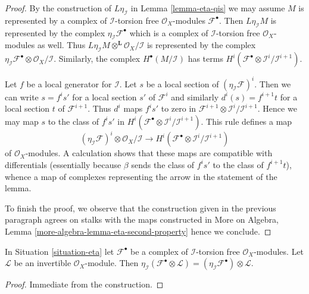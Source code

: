 \begin{proof}
By the construction of $L\eta_\mathcal{I}$ in Lemma \ref{lemma-eta-qis}
we may assume $M$ is represented by a complex of $\mathcal{I}$-torsion
free $\mathcal{O}_X$-modules $\mathcal{F}^\bullet$. Then
$L\eta_\mathcal{I}M$ is represented by the complex
$\eta_\mathcal{I}\mathcal{F}^\bullet$ which is a
complex of $\mathcal{I}$-torsion free $\mathcal{O}_X$-modules as well.
Thus $L\eta_\mathcal{I}M \otimes^\mathbf{L} \mathcal{O}_X/\mathcal{I}$
is represented by the complex
$\eta_\mathcal{I}\mathcal{F}^\bullet \otimes \mathcal{O}_X/\mathcal{I}$.
Similarly, the complex $H^\bullet(M/\mathcal{I})$ has terms
$H^i(\mathcal{F}^\bullet \otimes \mathcal{I}^i/\mathcal{I}^{i + 1})$.

\medskip\noindent
Let $f$ be a local generator for $\mathcal{I}$.
Let $s$ be a local section of $(\eta_\mathcal{I}\mathcal{F})^i$.
Then we can write $s = f^is'$ for a local section $s'$ of
$\mathcal{F}^i$ and similarly $d^i(s) = f^{i + 1}t$ for a local
section $t$ of $\mathcal{F}^{i + 1}$. Thus $d^i$ maps $f^is'$
to zero in $\mathcal{F}^{i + 1} \otimes \mathcal{I}^i/\mathcal{I}^{i + 1}$.
Hence we may map $s$ to the class of $f^is'$ in
$H^i(\mathcal{F}^\bullet \otimes \mathcal{I}^i/\mathcal{I}^{i + 1})$.
This rule defines a map
$$
(\eta_\mathcal{I}\mathcal{F})^i \otimes \mathcal{O}_X/\mathcal{I}
\longrightarrow
H^i(\mathcal{F}^\bullet \otimes \mathcal{I}^i/\mathcal{I}^{i + 1})
$$
of $\mathcal{O}_X$-modules. A calculation shows that these maps
are compatible with differentials (essentially because $\beta$
sends the class of $f^is'$ to the class of $f^{i + 1}t$), whence
a map of complexes representing the arrow in the statement of the lemma.

\medskip\noindent
To finish the proof, we observe that the construction given
in the previous paragraph agrees on stalks with the maps
constructed in More on Algebra, Lemma
\ref{more-algebra-lemma-eta-second-property}
hence we conclude.
\end{proof}

\begin{lemma}
\label{lemma-eta-tensor-invertible}
In Situation \ref{situation-eta}
let $\mathcal{F}^\bullet$ be a complex of
$\mathcal{I}$-torsion free $\mathcal{O}_X$-modules.
Let $\mathcal{L}$ be an invertible $\mathcal{O}_X$-module.
Then $\eta_\mathcal{I}(\mathcal{F}^\bullet \otimes \mathcal{L}) =
(\eta_\mathcal{I}\mathcal{F}^\bullet) \otimes \mathcal{L}$.
\end{lemma}

\begin{proof}
Immediate from the construction.
\end{proof}

